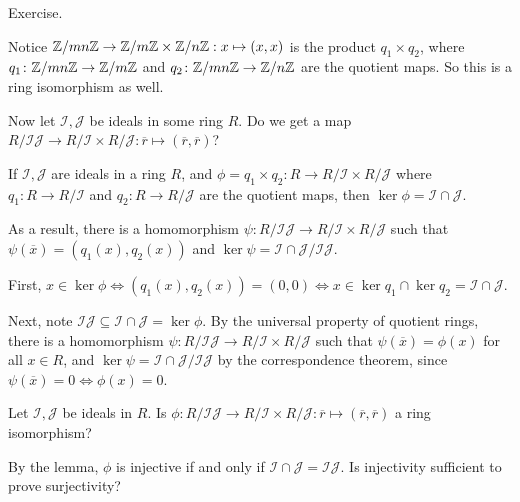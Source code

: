 \documentclass[12pt,letterpaper]{report}
\begin{document}
\begin{thmproof}
  Exercise.
\end{thmproof}

Notice $\mathbb{Z}/{mn}\mathbb{Z} \to \mathbb{Z}/{m}\mathbb{Z} \times \mathbb{Z}/{n}\mathbb{Z} : x \mapsto(x, x)$ is the product $q_1 \times q_2$,
where $q_1 \colon \mathbb{Z}/{mn}\mathbb{Z} \to \mathbb{Z}/{m}\mathbb{Z}$ and $q_2 \colon \mathbb{Z}/{mn}\mathbb{Z} \to \mathbb{Z}/{n}\mathbb{Z}$ are the quotient
maps.
So this is a ring isomorphism as well.

Now let $\mathcal{I}, \mathcal{J}$ be ideals in some ring $R$.
Do we get a map $R/\mathcal{IJ} \to R/\mathcal{I} \times R/\mathcal{J} :
  \overline{r} \mapsto (\overline{r}, \overline{r})$?

\begin{lem}{}{}
  If $\mathcal{I}, \mathcal{J}$ are ideals in a ring $R$, and
  $\phi = q_1 \times q_2 \colon R \to R/\mathcal{I} \times R/\mathcal{J}$ where
  $q_1 \colon R \to R/\mathcal{I}$ and $q_2 \colon R \to R/\mathcal{J}$ are the quotient maps, then
  $\ker\phi = \mathcal{I} \cap \mathcal{J}$.

  As a result, there is a homomorphism
  $\psi \colon R/\mathcal{IJ} \to R/\mathcal{I} \times R/\mathcal{J}$ such that
  $\psi(\overline{x}) = (q_1(x), q_2(x))$ and
  $\ker\psi = \mathcal{I} \cap \mathcal{J}/\mathcal{IJ}$.
\end{lem}

\begin{thmproof}
  First, $x \in \ker\phi \iff (q_1(x), q_2(x)) = (0, 0) \iff x \in \ker q_1 \cap \ker q_2 =
    \mathcal{I} \cap \mathcal{J}$.

  Next, note $\mathcal{IJ} \subseteq \mathcal{I} \cap \mathcal{J} = \ker\phi$.
  By the universal property of quotient rings, there is a homomorphism
  $\psi \colon R/\mathcal{IJ} \to R/\mathcal{I} \times R/\mathcal{J}$ such that
  $\psi(\overline{x}) = \phi(x)$ for all $x \in R$, and
  $\ker\psi = \mathcal{I} \cap \mathcal{J}/\mathcal{IJ}$ by the correspondence theorem, since
  $\psi(\overline{x}) = 0 \iff \phi(x) = 0$.
\end{thmproof}

\begin{tcolorbox}
  Let $\mathcal{I}, \mathcal{J}$ be ideals in $R$.
  Is $\phi \colon R/\mathcal{IJ} \to R/\mathcal{I} \times R/\mathcal{J} :
    \overline{r} \mapsto (\overline{r}, \overline{r})$ a ring isomorphism?
\end{tcolorbox}

By the lemma, $\phi$ is injective if and only if $\mathcal{I} \cap \mathcal{J} = \mathcal{IJ}$.
Is injectivity sufficient to prove surjectivity?
\end{document}

